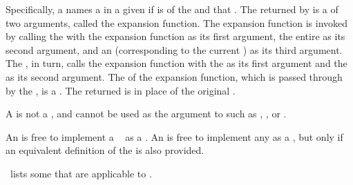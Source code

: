 Specifically, a  names a  in a given  if
 is  of the 
 and that .
The  returned by 
is a  of two arguments, called the
expansion function.
The expansion function is invoked by calling the  with
      the expansion function as its first argument,
      the entire  as its second argument,
    and an  (corresponding to the current )
      as its third argument.
The , in turn, calls the expansion function with the
 as its first argument and the  as its second argument.
The  of the expansion function, which is passed through
by the , is a . 
The returned  is  in place of the original .

A  is not a ,
and cannot be used as the  argument to  
such as , , or .

An  is free to implement a \clisp\ 
as a .  An  is free to implement any
  as a , but only
if an equivalent definition of the  is also provided.

\Thenextfigure\ lists some  that are applicable
to .


